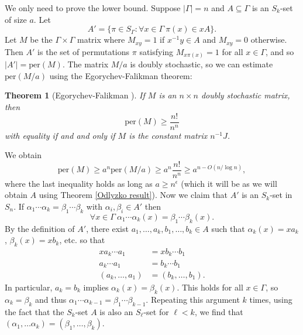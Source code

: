 \documentclass[12pt]{article}
\newcommand\per{\text{per}}
\newtheorem{thm}{Theorem}
\def\mike#1{\noindent
\textcolor{red}
{\textsc{(Mike:}
\textsf{#1})}}
\begin{document}
We only need to prove the lower bound. Suppose $|\Gamma|=n$ and $A\subseteq\Gamma$ is an $S_k$-set of size $a$. Let
$$A'=\{\pi\in S_\Gamma:\forall x\in\Gamma\ \pi(x)\in xA\}.$$
Let $M$ be the $\Gamma\times\Gamma$ matrix where $M_{xy}=1$ if $x^{-1}y\in A$ and $M_{xy}=0$ otherwise. Then $A'$ is the set of permutations $\pi$ satisfying $M_{x\pi(x)}=1$ for all $x\in\Gamma$, and so $|A'|=\mathrm{per}(M)$. The matrix $M/a$ is doubly stochastic, so we can estimate $\mathrm{per}(M/a)$ using the Egorychev-Falikman theorem:
\begin{thm}[Egorychev-Falikman \cite{egorychev,falikman}] \label{Egorychev Falikman}
If $M$ is an $n\times n$ doubly stochastic matrix, then 
$$\mathrm{per}(M)\ge\frac{n!}{n^n}$$
with equality if and and only if $M$ is the constant matrix $n^{-1}J$.
\end{thm}
We obtain %
$$\mathrm{per}(M)\ge a^n\per(M/a)\ge a^n\frac{n!}{n^n}\ge a^{n-O(n/\log n)},$$
where the last inequality holds as long as $a\geq n^\epsilon$ (which it will be as we will obtain $A$ using Theorem \ref{Odlyzko result}). Now we claim that $A'$ is an $S_k$-set in $S_n$. If $\alpha_1\cdots\alpha_k=\beta_1\cdots\beta_k$ with $\alpha_i,\beta_i\in A'$ then
$$\forall x\in\Gamma\ \alpha_1\cdots\alpha_k(x)=\beta_1\cdots\beta_k(x).$$
By the definition of $A'$, there exist $a_1,\ldots,a_k,b_1,\ldots,b_k\in A$ such that $\alpha_k(x)=xa_k$, $\beta_k(x)=xb_k$, etc. so that
$$\begin{aligned}xa_k\cdots a_1&=xb_k\cdots b_1\\
a_k\cdots a_1&=b_k\cdots b_1\\
(a_k,\ldots,a_1)&=(b_k,\ldots,b_1).
\end{aligned}$$ 
In particular, $a_k=b_k$ implies $\alpha_k(x)=\beta_k(x)$. This holds for all $x\in\Gamma$, so $\alpha_k=\beta_k$ and thus $\alpha_1\cdots\alpha_{k-1}=\beta_1\cdots\beta_{k-1}$. Repeating this argument $k$ times, using the fact that the $S_k$-set $A$ is also an $S_{\ell}$-set for $\ell<k$, we find that $(\alpha_1,\ldots\alpha_k)=(\beta_1,\ldots,\beta_k)$.
\end{document}
